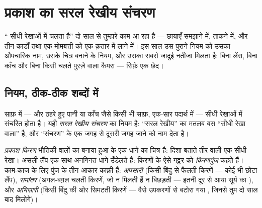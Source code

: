 \chapter{प्रकाश का सरल रेखीय संचरण}\label{ch:g6:light-propagation}

`` सीधी रेखाओं में चलता है'' दो साल से तुम्हारे काम आ रहा है ---
छायाएँ समझाने में,  ताकने में, और तीन कार्डों तथा एक मोमबत्ती को
एक क़तार में लाने में। इस साल उस पुराने नियम को उसका औपचारिक नाम, उसके
चित्र बनाने के नियम, और उसका सबसे जादुई नतीजा मिलता है: बिना लेंस,
बिना काँच और बिना किसी चलते पुरज़े वाला कैमरा --- सिर्फ़ एक छेद।

\section{नियम, ठीक-ठीक शब्दों में}

\begin{proposition}\label{prop:g6:light-propagation:law}
साफ़  में --- और ठहरे हुए पानी या काँच जैसे किसी भी साफ़, एक-सार
पदार्थ में ---  सीधी रेखाओं में संचरित होता है। यही
\emph{सरल रेखीय संचरण} का नियम है: ``सरल
रेखीय'' का मतलब बस ``सीधी रेखा वाला'' है, और ``संचरण''  के एक
जगह से दूसरी जगह जाने को नाम देता है।
\end{proposition}

\begin{definition}[किरण और किरणपुंज]\label{def:g6:light-propagation:ray}
\emph{प्रकाश किरण} भौतिकी वालों का बनाया हुआ
 के एक धागे का चित्र है: दिशा बताते तीर वाली एक सीधी रेखा। असली
लैंप एक साथ अनगिनत धागे उँडेलते हैं: किरणों के ऐसे गट्ठर को
\emph{किरणपुंज} कहते हैं। काम-काज के लिए पुंज के तीन
आकार काफ़ी हैं: \emph{अपसारी} (किसी बिंदु से फैलती किरणें --- कोई भी
छोटा लैंप), \emph{समांतर} (अगल-बग़ल चलती किरणें, जो न मिलती हैं न
बिछड़ती --- इतनी दूर से आया सूर्य का ), और \emph{अभिसारी}
(किसी बिंदु की ओर सिमटती किरणें --- वैसे उपकरणों से बटोरा गया ,
जिनसे तुम दो साल बाद मिलोगे)।
\end{definition}


